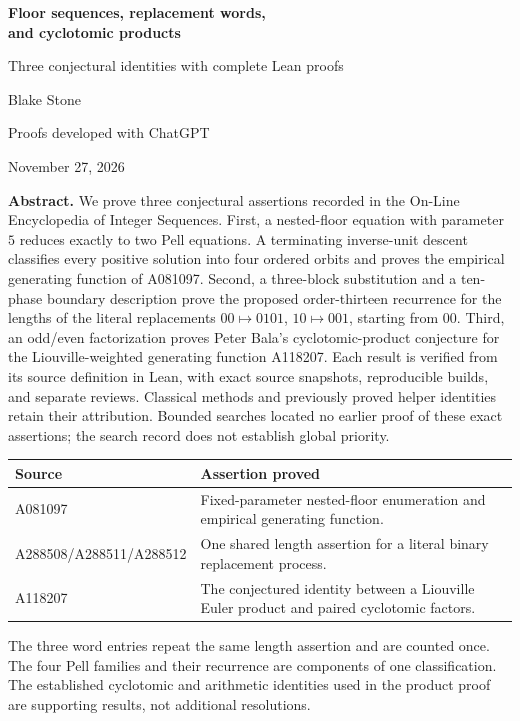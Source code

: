 \documentclass[11pt]{article}
\begin{document}
\begin{center}
{\LARGE\bfseries Floor sequences, replacement words,\\[3pt]
and cyclotomic products}\par
\vspace{0.5em}
{\large Three conjectural identities with complete Lean proofs}\par
\vspace{0.5em}
{\large Blake Stone}\par
Proofs developed with ChatGPT\par
November 27, 2026
\end{center}

\textbf{Abstract.}
We prove three conjectural assertions recorded in the On-Line Encyclopedia
of Integer Sequences. First, a nested-floor equation with parameter $5$
reduces exactly to two Pell equations. A terminating inverse-unit descent
classifies every positive solution into four ordered orbits and proves
the empirical generating function of A081097. Second, a three-block
substitution and a ten-phase boundary description prove the proposed
order-thirteen recurrence for the lengths of the literal replacements
$00\mapsto0101$, $10\mapsto001$, starting from $00$.
Third, an odd/even factorization proves Peter Bala's cyclotomic-product
conjecture for the Liouville-weighted generating function A118207.
Each result is verified from its source definition in Lean, with exact
source snapshots, reproducible builds, and separate reviews.
Classical methods and previously proved helper identities retain their
attribution. Bounded searches located no earlier proof of these exact
assertions; the search record does not establish global priority.

\begin{center}
\begin{tabular}{@{}l>{\raggedright\arraybackslash}p{4.5in}@{}}
\toprule
Source & Assertion proved\\
\midrule
A081097 & Fixed-parameter nested-floor enumeration and empirical generating function.\\
A288508/A288511/A288512 & One shared length assertion for a literal binary replacement process.\\
A118207 & The conjectured identity between a Liouville Euler product and paired cyclotomic factors.\\
\bottomrule
\end{tabular}
\end{center}

The three word entries repeat the same length assertion and are counted
once. The four Pell families and their recurrence are components of one
classification. The established cyclotomic and arithmetic identities used
in the product proof are supporting results, not additional resolutions.
\end{document}
